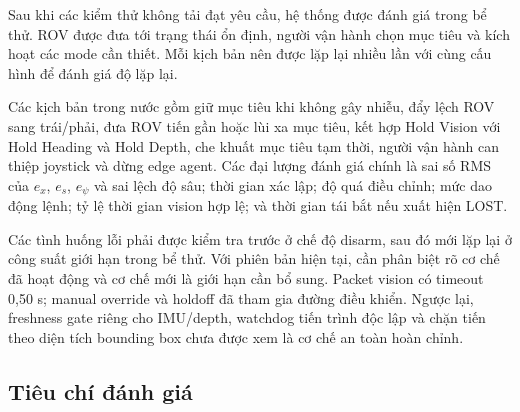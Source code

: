 \documentclass[../DoAn.tex]{subfiles}
\begin{document}
Sau khi các kiểm thử không tải đạt yêu cầu, hệ thống được đánh giá trong bể thử. ROV được đưa tới trạng thái ổn định, người vận hành chọn mục tiêu và kích hoạt các mode cần thiết. Mỗi kịch bản nên được lặp lại nhiều lần với cùng cấu hình để đánh giá độ lặp lại.

Các kịch bản trong nước gồm giữ mục tiêu khi không gây nhiễu, đẩy lệch ROV sang trái/phải, đưa ROV tiến gần hoặc lùi xa mục tiêu, kết hợp Hold Vision với Hold Heading và Hold Depth, che khuất mục tiêu tạm thời, người vận hành can thiệp joystick và dừng edge agent. Các đại lượng đánh giá chính là sai số RMS của $e_x$, $e_s$, $e_\psi$ và sai lệch độ sâu; thời gian xác lập; độ quá điều chỉnh; mức dao động lệnh; tỷ lệ thời gian vision hợp lệ; và thời gian tái bắt nếu xuất hiện LOST.

Các tình huống lỗi phải được kiểm tra trước ở chế độ disarm, sau đó mới lặp lại ở công suất giới hạn trong bể thử. Với phiên bản hiện tại, cần phân biệt rõ cơ chế đã hoạt động và cơ chế mới là giới hạn cần bổ sung. Packet vision có timeout 0,50 s; manual override và holdoff đã tham gia đường điều khiển. Ngược lại, freshness gate riêng cho IMU/depth, watchdog tiến trình độc lập và chặn tiến theo diện tích bounding box chưa được xem là cơ chế an toàn hoàn chỉnh.

\subsection{Tiêu chí đánh giá}
\end{document}
